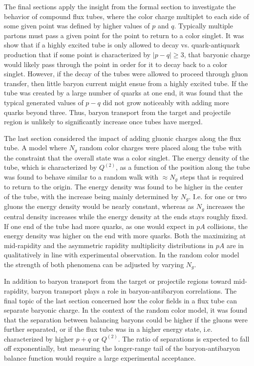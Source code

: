 \documentclass[aps, prc, 12pt, nofootinbib, showpacs, superscriptaddress, tightenlines, groupedaddress]{revtex4-2}
\begin{document}
The final sections apply the insight from the formal section to investigate the behavior of compound flux tubes, where the color charge multiplet to each side of some given point was defined by higher values of $p$ and $q$. Typically multiple partons must pass a given point for the point to return to a color singlet. It was show that if a highly excited tube is only allowed to decay vs. quark-antiquark production that if some point is characterized by $|p-q|\ge 3$, that baryonic charge would likely pass through the point in order for it to decay back to a color singlet. However, if the decay of the tubes were allowed to proceed through gluon transfer, then little baryon current might ensue from a highly excited tube. If the tube was created by a large number of quarks at one end, it was found that the typical generated values of $p-q$ did not grow noticeably with adding more quarks beyond three. Thus, baryon transport from the target and projectile region is unlikely to significantly increase once tubes have merged.

The last section considered the impact of adding gluonic charges along the flux tube. A model where $N_g$ random color charges were placed along the tube with the constraint that the overall state was a color singlet.  The energy density of the tube, which is characterized by $Q^{(2)}$, as a function of the position along the tube was found to behave similar to a random walk with $\approx N_g$ steps that is required to return to the origin. The energy density was found to be higher in the center of the tube, with the increase being mainly determined by $N_g$. I.e. for one or two gluons the energy density would be nearly constant, whereas as $N_g$ increases the central density increases while the energy density at the ends stays roughly fixed. If one end of the tube had more quarks, as one would expect in $pA$ collisions, the energy density was higher on the end with more quarks. Both the maximizing at mid-rapidity and the asymmetric rapidity multiplicity distributions in $pA$ are in qualitatively in line with experimental observation. In the random color model the strength of both phenomena can be adjusted by varying $N_g$.

In addition to baryon transport from the target or projectile regions toward mid-rapidity, baryon transport plays a role in baryon-antibaryon correlations. The final topic of the last section concerned how the color fields in a flux tube can separate baryonic charge. In the context of the random color model, it was found that the separation between balancing baryons could be higher if the gluons were further separated, or if the flux tube was in a higher energy state, i.e. characterized by higher $p+q$ or $Q^{(2)}$. The ratio of separations is expected to fall off exponentially, but measuring the longer-range tail of the baryon-antibaryon balance function would require a large experimental acceptance.
\end{document}
